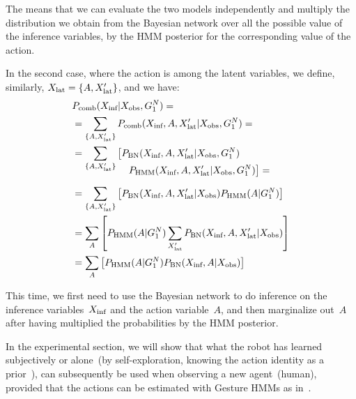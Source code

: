 The means that we can evaluate the two models independently and multiply the distribution we obtain from the Bayesian network over all the possible value of the inference variables, by the \ac{HMM} posterior for the corresponding value of the action.

In the second case, where the action is among the latent variables, we define, similarly, $X_\text{lat} = \{A, X_\text{lat}^\prime\}$, and we have:
\begin{align*}
  & \pcomb(\xinf| \xobs, G_1^N) = \\
  &= \sum_{\{A,\xlat^\prime\}} \pcomb(\xinf, A, \xlat^\prime| \xobs, G_1^N)=\\
  &= \sum_{\{A,\xlat^\prime\}} \left[\pbn(\xinf, A, \xlat^\prime| \xobs, G_1^N)\right. \\[-4mm]
    & \mspace{100mu} \left.\phmm(\xinf, A, \xlat^\prime| \xobs, G_1^N)\right]= \\[2mm]
  &= \sum_{\{A,\xlat^\prime\}} \left[\pbn(\xinf, A, \xlat^\prime| \xobs) \phmm(A | G_1^N)\right] \\
  &= \sum_{A}\left[\phmm(A | G_1^N)\sum_{\xlat^\prime} \pbn(\xinf, A, \xlat^\prime| \xobs)\right] \\
  &= \sum_{A}\left[\phmm(A | G_1^N) \pbn(\xinf, A| \xobs)\right] \\
\end{align*}

This time, we first need to use the Bayesian network to do inference on the inference variables~$X_\text{inf}$ and the action variable~$A$, and then marginalize out~$A$ after having multiplied the probabilities by the \ac{HMM} posterior.

%
%
%
%
In the experimental section, we will show that what the robot has learned subjectively or alone~(by self-exploration, knowing the action identity as a prior~\cite{salvi:2012:smcb}), can subsequently be used when observing a new agent~(human), provided that the actions can be estimated with Gesture \acp{HMM} as in~\cite{saponaro:2013:crhri}.
